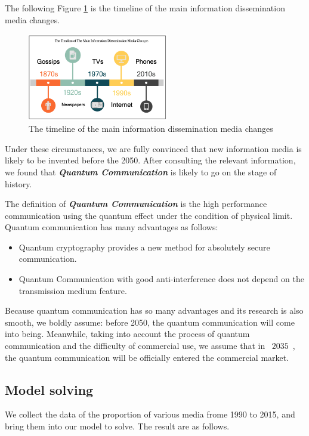 \documentclass[a4paper,11pt]{article}
\begin{document}
\par The following Figure \ref{fig:04} is the timeline of the main information dissemination media changes.
\begin{figure}[h]%
    \centering 
    \includegraphics[width=0.55\textwidth]{./Pic/04.png}
    \caption{The timeline of the main information dissemination media changes}
    \label{fig:04}  
\end{figure}

\par Under these circumstances, we are fully convinced that new information media is likely to be invented before the 2050. After consulting the relevant information\cite{RH}, we found that \textbf{\emph{Quantum Communication}} is likely to go on the stage of history. 

\par The definition of \textbf{\emph{Quantum Communication}} is the high performance communication using the quantum effect under the condition of physical limit. Quantum communication has many advantages as follows:

\begin{itemize}
\item Quantum cryptography provides a new method for absolutely secure communication.
\item Quantum Communication with good anti-interference does not depend on the transmission medium feature.
\end{itemize}
\par Because quantum communication has so many advantages and its research is also smooth, we boldly assume: before 2050, the quantum communication will come into being. Meanwhile, taking into account the process of quantum communication and the difficulty of commercial use, we assume that in ~$2035$~, the quantum communication will be officially entered the commercial market.




\subsection{Model solving}
\par We collect the data of the proportion of various media frome 1990 to 2015, and bring them into our model to solve. The result are as follows.
\end{document}
